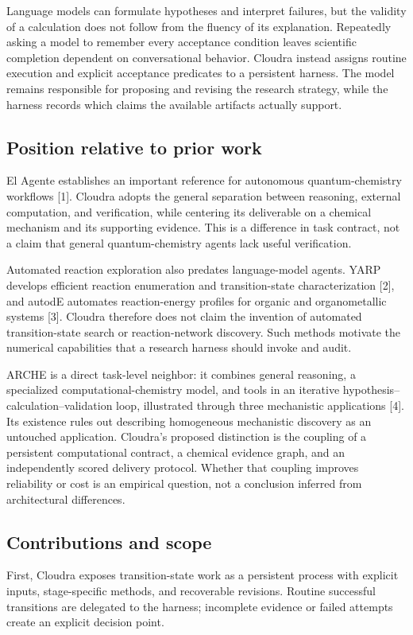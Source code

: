 \documentclass[11pt,a4paper]{article}
\begin{document}
Language models can formulate hypotheses and interpret failures, but the validity of a calculation does not follow from the fluency of its explanation. Repeatedly asking a model to remember every acceptance condition leaves scientific completion dependent on conversational behavior. Cloudra instead assigns routine execution and explicit acceptance predicates to a persistent harness. The model remains responsible for proposing and revising the research strategy, while the harness records which claims the available artifacts actually support.

\subsection{Position relative to prior work}
El Agente establishes an important reference for autonomous quantum-chemistry workflows [1]. Cloudra adopts the general separation between reasoning, external computation, and verification, while centering its deliverable on a chemical mechanism and its supporting evidence. This is a difference in task contract, not a claim that general quantum-chemistry agents lack useful verification.

Automated reaction exploration also predates language-model agents. YARP develops efficient reaction enumeration and transition-state characterization [2], and autodE automates reaction-energy profiles for organic and organometallic systems [3]. Cloudra therefore does not claim the invention of automated transition-state search or reaction-network discovery. Such methods motivate the numerical capabilities that a research harness should invoke and audit.

ARCHE is a direct task-level neighbor: it combines general reasoning, a specialized computational-chemistry model, and tools in an iterative hypothesis--calculation--validation loop, illustrated through three mechanistic applications [4]. Its existence rules out describing homogeneous mechanistic discovery as an untouched application. Cloudra's proposed distinction is the coupling of a persistent computational contract, a chemical evidence graph, and an independently scored delivery protocol. Whether that coupling improves reliability or cost is an empirical question, not a conclusion inferred from architectural differences.

\subsection{Contributions and scope}
First, Cloudra exposes transition-state work as a persistent process with explicit inputs, stage-specific methods, and recoverable revisions. Routine successful transitions are delegated to the harness; incomplete evidence or failed attempts create an explicit decision point.
\end{document}
